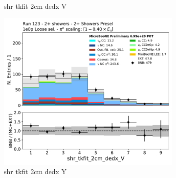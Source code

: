 \begin{figure}[H]
\begin{subfigure}{0.3\textwidth}
    \caption{shr tkfit 2cm dedx V}
    \end{subfigure}
    \begin{subfigure}{0.3\textwidth}
    \includegraphics[width=1.0\textwidth]{Sidebands/Figures/TwoShr_1e0pSel/loose/shr_tkfit_2cm_dedx_V.pdf}
    \caption{shr tkfit 2cm dedx Y}
    \end{subfigure}
    \caption{} 
    \label{fig:HE_1eNp_1}
\end{figure}

